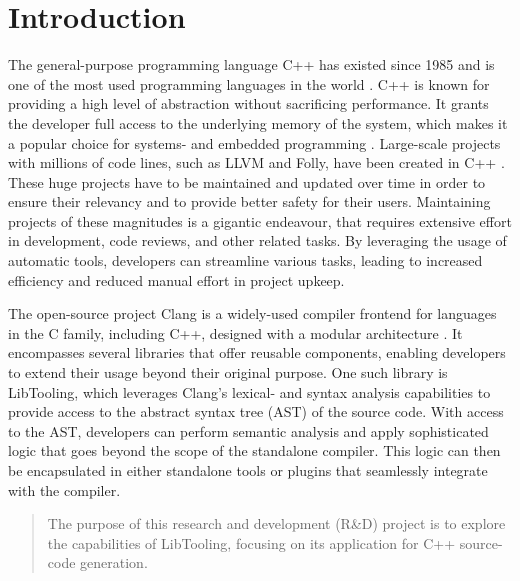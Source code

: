 \chapter{Introduction}

The general-purpose programming language C++ has existed since 1985 and is one of the most used programming languages in the world \cite{nexttechnologyprofessionalsMostPopularProgramming2022}.
C++ is known for providing a high level of abstraction without sacrificing performance.
It grants the developer full access to the underlying memory of the system, which makes it a popular choice for systems- and embedded programming  \cite{adminWhereUsedIndustry2021}.
Large-scale projects with millions of code lines, such as LLVM and Folly, have been created in C++ \cite{llvmLLVMCompilerInfrastructure, facebookFollyFacebookOpensource2023}.
These huge projects have to be maintained and updated over time in order to ensure their relevancy and to provide better safety for their users.
Maintaining projects of these magnitudes is a gigantic endeavour, that requires extensive effort in development, code reviews, and other related tasks.
By leveraging the usage of automatic tools, developers can streamline various tasks, leading to increased efficiency and reduced manual effort in project upkeep.

The open-source project Clang is a widely-used compiler frontend for languages in the C family, including C++, designed with a modular architecture \cite{clangClangLanguageFamily}.
It encompasses several libraries that offer reusable components, enabling developers to extend their usage beyond their original purpose.
One such library is LibTooling, which leverages Clang's lexical- and syntax analysis capabilities to provide access to the abstract syntax tree (AST) of the source code.
With access to the AST, developers can perform semantic analysis and apply sophisticated logic that goes beyond the scope of the standalone compiler.
This logic can then be encapsulated in either standalone tools or plugins that seamlessly integrate with the compiler.

\begin{quote}
    The purpose of this research and development (R\&D) project is to explore the capabilities of LibTooling, focusing on its application for C++ source-code generation.
\end{quote}

